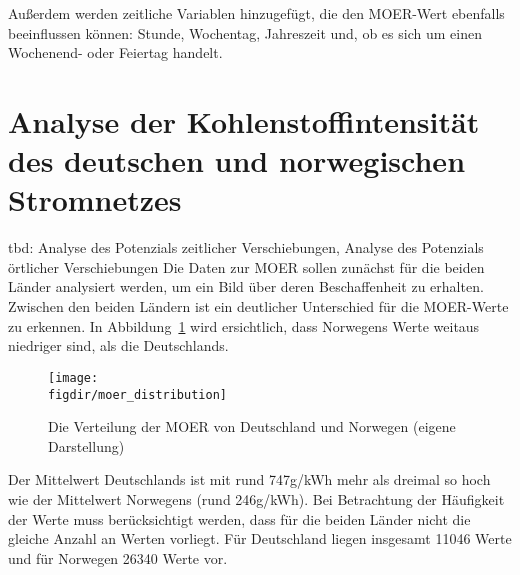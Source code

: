Außerdem werden zeitliche Variablen hinzugefügt, die den MOER-Wert ebenfalls beeinflussen können: Stunde, Wochentag, Jahreszeit und, ob es sich um einen Wochenend- oder Feiertag handelt.

\section{Analyse der Kohlenstoffintensität des deutschen und norwegischen Stromnetzes}\label{CAP:ci-analysis}
tbd: Analyse des Potenzials zeitlicher Verschiebungen, Analyse des Potenzials örtlicher Verschiebungen
Die Daten zur \ac{MOER} sollen zunächst für die beiden Länder analysiert werden, um ein Bild über deren Beschaffenheit zu erhalten.
Zwischen den beiden Ländern ist ein deutlicher Unterschied für die MOER-Werte zu erkennen.
In Abbildung~\ref{FIG:moer_distribution} wird ersichtlich, dass Norwegens Werte weitaus niedriger sind, als die Deutschlands.
\begin{figure}
 \caption{Die Verteilung der MOER von Deutschland und Norwegen (eigene Darstellung)}
 {\texttt{[image: \\figdir/moer\_distribution]}}
 \label{FIG:moer_distribution}
\end{figure}
Der Mittelwert Deutschlands ist mit rund 747g/kWh mehr als dreimal so hoch wie der Mittelwert Norwegens (rund 246g/kWh).
Bei Betrachtung der Häufigkeit der Werte muss berücksichtigt werden, dass für die beiden Länder nicht die gleiche Anzahl an Werten vorliegt.
Für Deutschland liegen insgesamt 11046 Werte und für Norwegen 26340 Werte vor.

